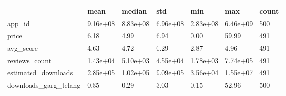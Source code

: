 \begin{tabular}{lllllll}
\toprule
 & mean & median & std & min & max & count \\
\midrule
app_id & 9.16e+08 & 8.83e+08 & 6.96e+08 & 2.83e+08 & 6.46e+09 & 500 \\
price & 6.18 & 4.99 & 6.94 & 0.00 & 59.99 & 491 \\
avg_score & 4.63 & 4.72 & 0.29 & 2.87 & 4.96 & 491 \\
reviews_count & 1.43e+04 & 5.10e+03 & 4.55e+04 & 1.78e+03 & 7.74e+05 & 491 \\
estimated_downloads & 2.85e+05 & 1.02e+05 & 9.09e+05 & 3.56e+04 & 1.55e+07 & 491 \\
downloads_garg_telang & 0.85 & 0.29 & 3.03 & 0.15 & 52.96 & 500 \\
\bottomrule
\end{tabular}
